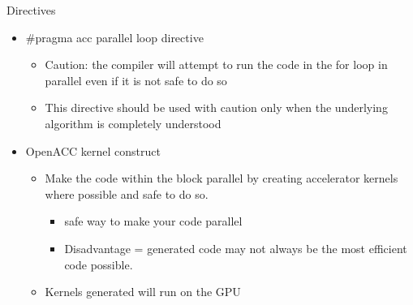 \documentclass[aspectratio=169]{beamer}
\begin{document}
\begin{frame}[fragile]{Directives}

\begin{itemize}
\item \#pragma acc parallel loop directive
\begin{itemize}
\item Caution: the compiler will attempt to run the code in the for loop in parallel even if it is not safe to do so
\item This directive should be used with caution only when the underlying algorithm is completely understood
\end{itemize}
\item OpenACC kernel construct
\begin{itemize}
\item Make the code within the block parallel by creating accelerator kernels where possible and safe to do so.
\begin{itemize}
\item safe way to make your code parallel
\item Disadvantage = generated code may not always be the most efficient code possible. 
\end{itemize}
\item Kernels generated will run on the GPU
\end{itemize}
\end{itemize}



\end{frame}
\end{document}
